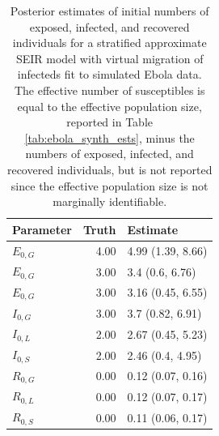 \begin{table}[htbp]
	\caption[Posterior estimates of initial numbers of exposed, infected, and recovered individuals for a stratified SEIR model fit to simulated Ebola data.]{Posterior estimates of initial numbers of exposed, infected, and recovered individuals for a stratified approximate SEIR model with virtual migration of infecteds fit to simulated Ebola data. The effective number of susceptibles is equal to the effective population size, reported in Table \ref{tab:ebola_synth_ests}, minus the numbers of exposed, infected, and recovered individuals, but is not reported since the effective population size is not marginally identifiable.}
	\label{tab:ebola_synth_initdist_res}
	\centering
	\begin{tabular}{lrl}
		\hline
		\textbf{Parameter} & \textbf{Truth} & \textbf{Estimate} \\ 
		\hline
		$ E_{0,G} $& 4.00 & 4.99 (1.39, 8.66) \\ 
		$ E_{0,G} $& 3.00 & 3.4 (0.6, 6.76) \\ 
		$ E_{0,G} $& 3.00 & 3.16 (0.45, 6.55) \\ 
		$ I_{0,G} $& 3.00 & 3.7 (0.82, 6.91) \\ 
		$ I_{0,L} $& 2.00 & 2.67 (0.45, 5.23) \\ 
		$ I_{0,S} $& 2.00 & 2.46 (0.4, 4.95) \\ 
		$ R_{0,G} $& 0.00 & 0.12 (0.07, 0.16) \\ 
		$ R_{0,L} $	& 0.00 & 0.12 (0.07, 0.17) \\ 
		$ R_{0,S} $& 0.00 & 0.11 (0.06, 0.17) \\ 
		\hline
	\end{tabular}
\end{table}

